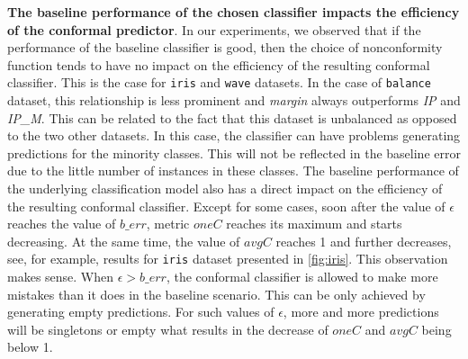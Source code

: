     \textbf{The baseline performance of the chosen classifier impacts the efficiency of the conformal predictor}.
        In our experiments, we observed that if the performance of the baseline classifier is good, then the choice of nonconformity function tends to have no impact on the efficiency of the resulting conformal classifier. This is the case for \verb|iris| and \verb|wave| datasets.
        In the case of \verb|balance| dataset, this relationship is less prominent and \textit{margin} always outperforms \textit{IP} and \textit{IP\_M}.
        This can be related to the fact that this dataset is unbalanced as opposed to the two other datasets.
        In this case, the classifier can have problems generating predictions for the minority classes. This will not be reflected in the baseline error due to the little number of instances in these classes.
        The baseline performance of the underlying classification model also has a direct impact on the efficiency of the resulting conformal classifier. 
        Except for some cases, soon after the value of $\epsilon$ reaches the value of $b\_err$,
        metric $oneC$ reaches its maximum and starts decreasing.
        At the same time, the value of $avgC$ reaches 1 and further decreases,
        see, for example, results for \verb|iris| dataset presented in \cref{fig:iris}.
        This observation makes sense.
        When $\epsilon > b\_err$, the conformal classifier is allowed to make more mistakes than it does in the baseline scenario. 
        This can be only achieved by generating empty predictions.
        For such values of $\epsilon$, more and more predictions will be singletons or empty what results in the decrease of $oneC$ and $avgC$ being below 1.





%
%


%
%
%


%
%
%
%



